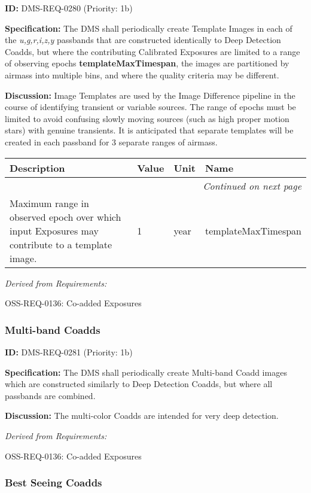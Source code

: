 \documentclass[SE,toc,lsstdraft]{lsstdoc}
\makeatletter
\newcommand{\paramname}[1]{\hspace{0pt}#1}
\newcommand{\unitname}[1]{\hspace{0pt}#1}
\newenvironment{parameters}[0]{%
\setlength\LTleft{0pt}
\setlength\LTright{\fill}
\begin{small}
\begin{longtable}[]{|p{0.49\textwidth}|l|p{0.6in}|p{1.70in}@{}|}

\hline \textbf{Description} & \textbf{Value} & \textbf{Unit} & \textbf{Name} \\ \hline
\endhead

\hline \multicolumn{4}{r}{\emph{Continued on next page}} \\
\endfoot

\hline\hline
\endlastfoot
}{%
\hline
\end{longtable}
\end{small}
}
\makeatother
\begin{document}
\label{DMS-REQ-0280}
\textbf{ID:} DMS-REQ-0280 (Priority: 1b)

\textbf{Specification:} The DMS shall periodically create Template Images in each of the \textit{u,g,r,i,z,y} passbands that are constructed identically to Deep Detection Coadds, but where the contributing Calibrated Exposures are limited to a range of observing epochs \textbf{templateMaxTimespan}, the images are partitioned by airmass into multiple bins, and where the quality criteria may be different.

\textbf{Discussion: }Image Templates are used by the Image Difference pipeline in the course of identifying transient or variable sources. The range of epochs must be limited to avoid confusing slowly moving sources (such as high proper motion stars) with genuine transients. It is anticipated that separate templates will be created in each passband for 3 separate ranges of airmass.

\begin{parameters}
Maximum range in observed epoch over which input Exposures may contribute to a template image.
&
1
&
\unitname{%
year
}
&
\paramname{%
templateMaxTimespan
} \\\hline
\end{parameters}

\emph{Derived from Requirements:}

OSS-REQ-0136:
Co-added Exposures \newline

\subsubsection{Multi-band Coadds}

\label{DMS-REQ-0281}
\textbf{ID:} DMS-REQ-0281 (Priority: 1b)

\textbf{Specification:} The DMS shall periodically create Multi-band Coadd images which are constructed similarly to Deep Detection Coadds, but where all passbands are combined.

\textbf{Discussion: }The multi-color Coadds are intended for very deep detection.

\emph{Derived from Requirements:}

OSS-REQ-0136:
Co-added Exposures \newline

\subsubsection{Best Seeing Coadds}
\end{document}
